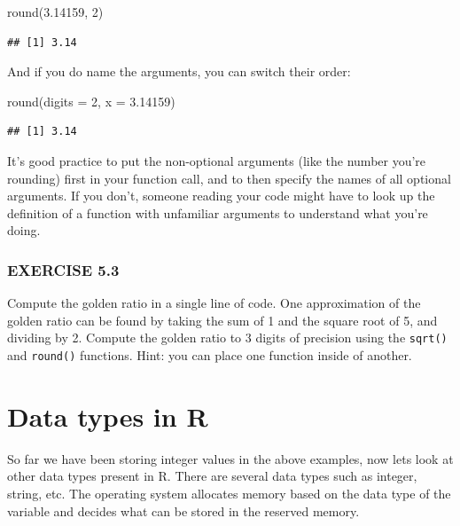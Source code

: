 \documentclass[
]{book}
\newenvironment{Shaded}{\begin{snugshade}}{\end{snugshade}}
\newcommand{\AttributeTok}[1]{\textcolor[rgb]{0.77,0.63,0.00}{#1}}
\newcommand{\DecValTok}[1]{\textcolor[rgb]{0.00,0.00,0.81}{#1}}
\newcommand{\FloatTok}[1]{\textcolor[rgb]{0.00,0.00,0.81}{#1}}
\newcommand{\FunctionTok}[1]{\textcolor[rgb]{0.00,0.00,0.00}{#1}}
\newcommand{\NormalTok}[1]{#1}
\begin{document}
\begin{Shaded}
\begin{Highlighting}[]
\FunctionTok{round}\NormalTok{(}\FloatTok{3.14159}\NormalTok{, }\DecValTok{2}\NormalTok{)}
\end{Highlighting}
\end{Shaded}

\begin{verbatim}
## [1] 3.14
\end{verbatim}

And if you do name the arguments, you can switch their order:

\begin{Shaded}
\begin{Highlighting}[]
\FunctionTok{round}\NormalTok{(}\AttributeTok{digits =} \DecValTok{2}\NormalTok{, }\AttributeTok{x =} \FloatTok{3.14159}\NormalTok{)}
\end{Highlighting}
\end{Shaded}

\begin{verbatim}
## [1] 3.14
\end{verbatim}

It's good practice to put the non-optional arguments (like the number you're rounding) first in your function call, and to then specify the names of all optional arguments. If you don't, someone reading your code might have to look up the definition of a function with unfamiliar arguments to understand what you're doing.

\hypertarget{exercise-5.3}{%
\subsubsection*{EXERCISE 5.3}\label{exercise-5.3}}

Compute the golden ratio in a single line of code. One approximation of the golden ratio can be found by taking the sum of 1 and the square root of 5, and dividing by 2. Compute the golden ratio to 3 digits of precision using the \texttt{sqrt()} and \texttt{round()} functions. Hint: you can place one function inside of another.

\hypertarget{data-types-in-r}{%
\section{Data types in R}\label{data-types-in-r}}

So far we have been storing integer values in the above examples, now lets look at other data types present in R. There are several data types such as integer, string, etc. The operating system allocates memory based on the data type of the variable and decides what can be stored in the reserved memory.
\end{document}
